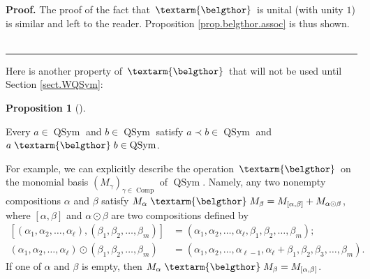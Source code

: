 \documentclass[numbers=enddot,12pt,final,onecolumn,notitlepage,abstracton]{scrartcl}%
\theoremstyle{definition}
\newtheorem{prop}[theo]{Proposition}
\newenvironment{proposition}[1][]
{\begin{prop}[#1]\begin{leftbar}}
{\end{leftbar}\end{prop}}
\newenvironment{proof}[1][Proof]{\noindent\textbf{#1.} }{\ \rule{0.5em}{0.5em}}
\newenvironment{verlong}{}{}
\newenvironment{vershort}{}{}
\newcommand{\bel}{\left. \textarm{\belgthor} \right.}
\begin{document}
\begin{verlong}
\begin{proof}
The proof of the fact that $\bel $ is unital (with unity $1$) is similar and
left to the reader. Proposition \ref{prop.belgthor.assoc} is thus shown.
\end{proof}
\end{verlong}

Here is another property of $\bel $ that will not be used until Section
\ref{sect.WQSym}:

\begin{proposition}
\label{prop.QSym.closed}Every $a\in\operatorname*{QSym}$ and $b\in
\operatorname*{QSym}$ satisfy $a\left.  \prec\right.  b\in\operatorname*{QSym}%
$ and $a \bel b\in\operatorname*{QSym}$.
\end{proposition}

\begin{vershort}
For example, we can explicitly describe the operation $\bel $ on the monomial
basis $\left(  M_{\gamma}\right)  _{\gamma\in\operatorname*{Comp}}$ of
$\operatorname*{QSym}$. Namely, any two nonempty compositions $\alpha$ and
$\beta$ satisfy $M_{\alpha} \bel M_{\beta}=M_{\left[  \alpha,\beta\right]
}+M_{\alpha\odot\beta}$, where $\left[  \alpha,\beta\right]  $ and
$\alpha\odot\beta$ are two compositions defined by%
\begin{align*}
\left[  \left(  \alpha_{1},\alpha_{2},\ldots,\alpha_{\ell}\right)  ,\left(
\beta_{1},\beta_{2},\ldots,\beta_{m}\right)  \right]   &  =\left(  \alpha
_{1},\alpha_{2},\ldots,\alpha_{\ell},\beta_{1},\beta_{2},\ldots,\beta
_{m}\right)  ;\\
\left(  \alpha_{1},\alpha_{2},\ldots,\alpha_{\ell}\right)  \odot\left(
\beta_{1},\beta_{2},\ldots,\beta_{m}\right)   &  =\left(  \alpha_{1}%
,\alpha_{2},\ldots,\alpha_{\ell-1},\alpha_{\ell}+\beta_{1},\beta_{2},\beta
_{3},\ldots,\beta_{m}\right)  .
\end{align*}
If one of $\alpha$ and $\beta$ is empty, then $M_{\alpha} \bel M_{\beta
}=M_{\left[  \alpha,\beta\right]  }$.
\end{vershort}
\end{document}
